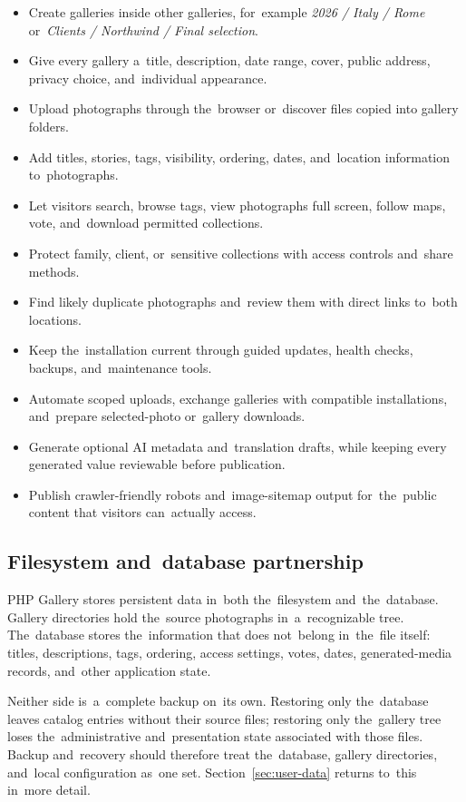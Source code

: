 \documentclass[11pt,a4paper]{article}
\begin{document}
\begin{itemize}
  \item Create galleries inside other galleries, for~example \emph{2026 / Italy
  / Rome} or~\emph{Clients / Northwind / Final selection}.
  \item Give every gallery a~title, description, date range, cover, public
  address, privacy choice, and~individual appearance.
  \item Upload photographs through the~browser or~discover files copied into
  gallery folders.
  \item Add titles, stories, tags, visibility, ordering, dates, and~location
  information to~photographs.
  \item Let visitors search, browse tags, view photographs full screen, follow
  maps, vote, and~download permitted collections.
  \item Protect family, client, or~sensitive collections with access controls
  and~share methods.
  \item Find likely duplicate photographs and~review them with direct links
  to~both locations.
  \item Keep the~installation current through guided updates, health checks,
  backups, and~maintenance tools.
  \item Automate scoped uploads, exchange galleries with compatible
  installations, and~prepare selected-photo or~gallery downloads.
  \item Generate optional AI metadata and~translation drafts, while keeping
  every generated value reviewable before publication.
  \item Publish crawler-friendly robots and~image-sitemap output for~the~public
  content that visitors can~actually access.
\end{itemize}

\subsection{Filesystem and~database partnership}

PHP Gallery stores persistent data in~both the~filesystem and~the~database.
Gallery directories hold the~source photographs in~a~recognizable tree.
The~database stores the~information that does not~belong in~the~file itself:
titles, descriptions, tags, ordering, access settings, votes, dates,
generated-media records, and~other application state.

Neither side is~a~complete backup on~its own. Restoring only the~database leaves
catalog entries without their source files; restoring only the~gallery tree
loses the~administrative and~presentation state associated with those files.
Backup and~recovery should therefore treat the~database, gallery directories,
and~local configuration as~one set. Section~\ref{sec:user-data} returns to~this
in~more detail.
\end{document}
